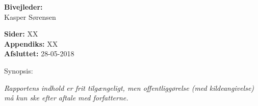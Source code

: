 \begin{minipage}[t]{0.48\textwidth}
 
\textbf{Bivejleder:} %
\\\hspace*{2ex}Kasper Sørensen
 \\ \bigskip\hspace{2ex}

\vspace*{0.5cm}

\textbf{Sider:}  XX\\
\textbf{Appendiks:} XX \\ 
\textbf{Afsluttet:} 28-05-2018

\end{minipage}
\hfill
\begin{minipage}[t]{1.5\textwidth}%
Synopsis: \\[1pt]
\fbox{\parbox{8.5cm}{}}
\end{minipage}

\vfill

{\footnotesize\itshape Rapportens indhold er frit tilgængeligt, men offentliggørelse (med kildeangivelse) må kun ske efter aftale
med forfatterne.}

